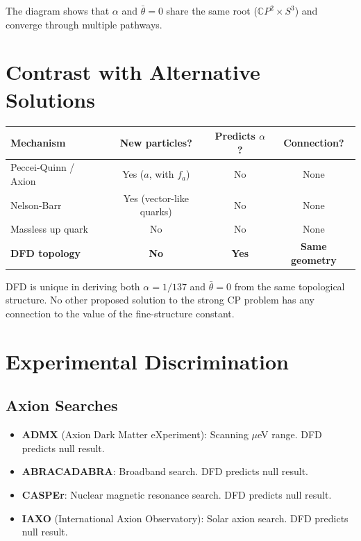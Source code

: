 \documentclass[11pt]{article}
\theoremstyle{remark}
\begin{document}
The diagram shows that $\alpha$ and $\bar\theta = 0$ share the same root
($\mathbb{C}P^2 \times S^3$) and converge through multiple pathways.

\section{Contrast with Alternative Solutions}

\begin{center}
\renewcommand{\arraystretch}{1.3}
\begin{tabular}{lccc}
\hline
\textbf{Mechanism} & \textbf{New particles?} & \textbf{Predicts $\alpha$?}
  & \textbf{Connection?} \\
\hline
Peccei-Quinn / Axion & Yes ($a$, with $f_a$) & No & None \\
Nelson-Barr & Yes (vector-like quarks) & No & None \\
Massless up quark & No & No & None \\
\textbf{DFD topology} & \textbf{No} & \textbf{Yes} &
  \textbf{Same geometry} \\
\hline
\end{tabular}
\end{center}

DFD is unique in deriving both $\alpha = 1/137$ and $\bar\theta = 0$ from
the same topological structure.  No other proposed solution to the strong CP
problem has any connection to the value of the fine-structure constant.

\section{Experimental Discrimination}

\subsection{Axion Searches}

\begin{itemize}
\item \textbf{ADMX} (Axion Dark Matter eXperiment): Scanning $\mu$eV range.
  DFD predicts null result.
\item \textbf{ABRACADABRA}: Broadband search. DFD predicts null result.
\item \textbf{CASPEr}: Nuclear magnetic resonance search. DFD predicts null result.
\item \textbf{IAXO} (International Axion Observatory): Solar axion search.
  DFD predicts null result.
\end{itemize}
\end{document}
